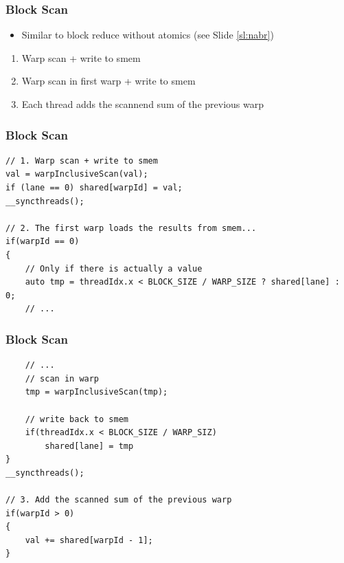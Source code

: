 \documentclass[aspectratio=169,handout]{beamer}
\begin{document}
\begin{frame}[fragile]
\frametitle{Block Scan}
\begin{itemize}
	\item Similar to block reduce without atomics (see Slide \ref{sl:nabr})
\end{itemize}
\begin{enumerate}
	\item Warp scan + write to smem
	\item Warp scan in first warp + write to smem
	\item Each thread adds the scannend sum of the previous warp
\end{enumerate}

\end{frame}


\begin{frame}[fragile]
\frametitle{Block Scan}

\begin{lstlisting}
// 1. Warp scan + write to smem
val = warpInclusiveScan(val);
if (lane == 0) shared[warpId] = val;
__syncthreads();

// 2. The first warp loads the results from smem...
if(warpId == 0)
{
	// Only if there is actually a value
	auto tmp = threadIdx.x < BLOCK_SIZE / WARP_SIZE ? shared[lane] : 0;
	// ...
\end{lstlisting}
\end{frame}


\begin{frame}[fragile]
\frametitle{Block Scan}


\begin{lstlisting}
	// ...
	// scan in warp
	tmp = warpInclusiveScan(tmp); 
	
	// write back to smem
	if(threadIdx.x < BLOCK_SIZE / WARP_SIZ)
		shared[lane] = tmp
}
__syncthreads();

// 3. Add the scanned sum of the previous warp
if(warpId > 0)
{
	val += shared[warpId - 1];
}
\end{lstlisting}
\end{frame}
\end{document}

